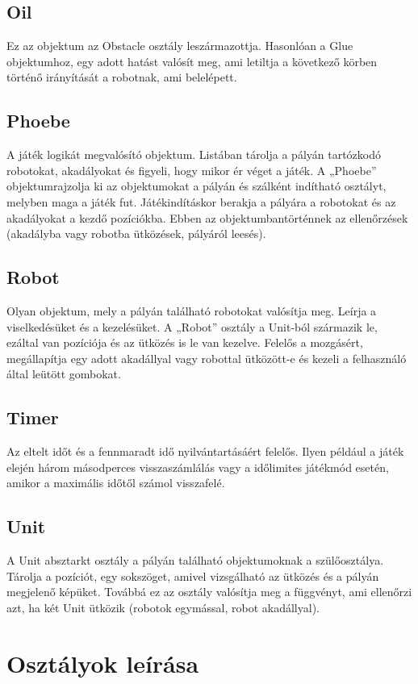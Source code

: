 \subsection{Oil}
Ez az objektum az Obstacle osztály leszármazottja. Hasonlóan a Glue objektumhoz, egy adott hatást valósít meg, ami letiltja a következő körben történő irányítását a robotnak, ami belelépett.
\subsection{Phoebe}
A játék logikát megvalósító objektum. Listában tárolja a pályán tartózkodó robotokat, akadályokat és figyeli, hogy mikor ér véget a játék. A „Phoebe” objektumrajzolja ki az objektumokat a pályán és szálként indítható osztályt, melyben maga a játék fut. Játékindításkor berakja a pályára a robotokat és az akadályokat a kezdő pozíciókba. Ebben az objektumbantörténnek az ellenőrzések (akadályba vagy robotba ütközések, pályáról leesés).
\subsection{Robot}
Olyan objektum, mely a pályán található robotokat valósítja meg. Leírja a viselkedésüket és a kezelésüket. A „Robot” osztály a Unit-ból származik le, ezáltal van pozíciója és az ütközés is le van kezelve. Felelős a mozgásért, megállapítja egy adott akadállyal vagy robottal ütközött-e és kezeli a felhasználó által leütött gombokat.

\subsection{Timer}
Az eltelt időt és a fennmaradt idő nyilvántartásáért felelős. Ilyen például a játék elején három másodperces visszaszámlálás vagy a időlimites játékmód esetén, amikor a maximális időtől számol visszafelé. 
\subsection{Unit}
A Unit absztarkt osztály a pályán található objektumoknak a szülőosztálya. Tárolja a pozíciót, egy sokszöget, amivel vizsgálható az ütközés és a pályán megjelenő képüket. Továbbá ez az osztály valósítja meg a függvényt, ami ellenőrzi azt, ha két Unit ütközik (robotok egymással, robot akadállyal).


\section{Osztályok leírása}

